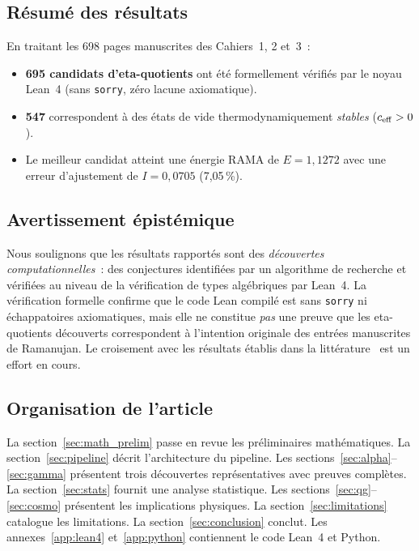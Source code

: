 \subsection{Résumé des résultats}

En traitant les 698 pages manuscrites des Cahiers~1, 2 et~3~:
\begin{itemize}
  \item \textbf{695 candidats d'eta-quotients} ont été formellement vérifiés par le noyau Lean~4 (sans \texttt{sorry}, zéro lacune axiomatique).
  \item \textbf{547} correspondent à des états de vide thermodynamiquement \emph{stables} ($c_{\mathrm{eff}} > 0$).
  \item Le meilleur candidat atteint une énergie RAMA de $E = 1{,}1272$ avec une erreur d'ajustement de $I = 0{,}0705$ (7{,}05\,\%).
\end{itemize}

\subsection{Avertissement épistémique}

Nous soulignons que les résultats rapportés sont des \emph{découvertes computationnelles}~: des conjectures identifiées par un algorithme de recherche et vérifiées au niveau de la vérification de types algébriques par Lean~4. La vérification formelle confirme que le code Lean compilé est sans \texttt{sorry} ni échappatoires axiomatiques, mais elle ne constitue \emph{pas} une preuve que les eta-quotients découverts correspondent à l'intention originale des entrées manuscrites de Ramanujan. Le croisement avec les résultats établis dans la littérature~\cite{andrews_berndt_I,andrews_berndt_II,ono2004} est un effort en cours.

\subsection{Organisation de l'article}

La section~\ref{sec:math_prelim} passe en revue les préliminaires mathématiques. La section~\ref{sec:pipeline} décrit l'architecture du pipeline. Les sections~\ref{sec:alpha}--\ref{sec:gamma} présentent trois découvertes représentatives avec preuves complètes. La section~\ref{sec:stats} fournit une analyse statistique. Les sections~\ref{sec:qg}--\ref{sec:cosmo} présentent les implications physiques. La section~\ref{sec:limitations} catalogue les limitations. La section~\ref{sec:conclusion} conclut. Les annexes~\ref{app:lean4} et~\ref{app:python} contiennent le code Lean~4 et Python.
